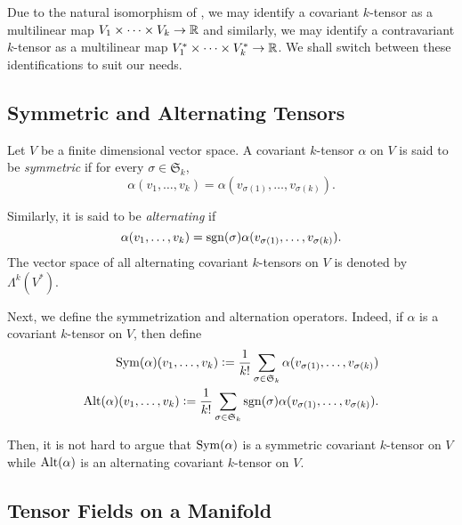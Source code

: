 Due to the natural isomorphism of , we may identify a covariant $k$-tensor as a multilinear map $V_1\times\dots\times V_k\to\mathbb{R}$ and similarly, we may identify a contravariant $k$-tensor as a multilinear map $V_1^*\times\dots\times V_k^*\to\mathbb{R}$. We shall switch between these identifications to suit our needs.

\subsection{Symmetric and Alternating Tensors}

\begin{definition}
    Let $V$ be a finite dimensional vector space. A covariant $k$-tensor $\alpha$ on $V$ is said to be \emph{symmetric} if for every $\sigma\in\mathfrak S_k$,
    \begin{equation*}
        \alpha(v_1,\dots,v_k) = \alpha(v_{\sigma(1)},\dots,v_{\sigma(k)}).
    \end{equation*}

    Similarly, it is said to be \emph{alternating} if 
    \begin{equation*}
        \alpha(v_1,\dots,v_k) = \operatorname{sgn}(\sigma)\alpha(v_{\sigma(1)},\dots,v_{\sigma(k)}).
    \end{equation*}
    The vector space of all alternating covariant $k$-tensors on $V$ is denoted by $\Lambda^k(V^*)$.
\end{definition}

Next, we define the symmetrization and alternation operators. Indeed, if $\alpha$ is a covariant $k$-tensor on $V$, then define 
\begin{align*}
    \operatorname{Sym}(\alpha)(v_1,\dots,v_k) := \frac{1}{k!}\sum_{\sigma\in\mathfrak S_k}\alpha(v_{\sigma(1)},\dots,v_{\sigma(k)})\\
    \operatorname{Alt}(\alpha)(v_1,\dots,v_k) := \frac{1}{k!}\sum_{\sigma\in\mathfrak S_k}\operatorname{sgn}(\sigma)\alpha(v_{\sigma(1)},\dots,v_{\sigma(k)}).
\end{align*}

Then, it is not hard to argue that $\operatorname{Sym}(\alpha)$ is a symmetric covariant $k$-tensor on $V$ while $\operatorname{Alt}(\alpha)$ is an alternating covariant $k$-tensor on $V$.

\subsection{Tensor Fields on a Manifold}

